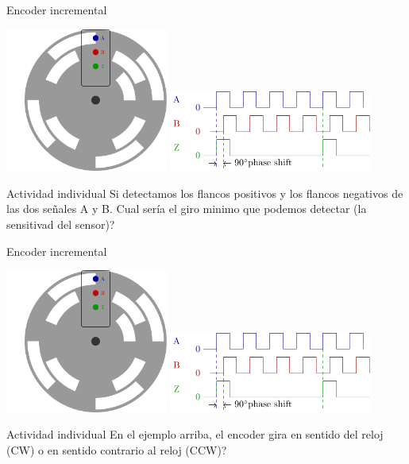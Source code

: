 \documentclass[presentation,aspectratio=169]{beamer}
\begin{document}
\begin{frame}[label={sec:org13f283c}]{Encoder incremental}
\begin{center}
\includegraphics[width=0.4\textwidth]{../../figures/encoder-disc}
\includegraphics[width=0.5\textwidth]{../../figures/encoder-signals}
\end{center}

\alert{Actividad individual} Si detectamos los flancos positivos \alert{y} los flancos negativos de las dos señales \textcolor{blue!80!black}{A} y \textcolor{red!80!black}{B}. Cual sería el giro minimo que podemos detectar (la sensitivad del sensor)?
\end{frame}


\begin{frame}[label={sec:orgabca622}]{Encoder incremental}
\begin{center}
\includegraphics[width=0.4\textwidth]{../../figures/encoder-disc}
\includegraphics[width=0.5\textwidth]{../../figures/encoder-signals}
\end{center}

\alert{Actividad individual} En el ejemplo arriba, el encoder gira en sentido del reloj (CW) o en sentido contrario al reloj (CCW)?
\end{frame}
\end{document}
